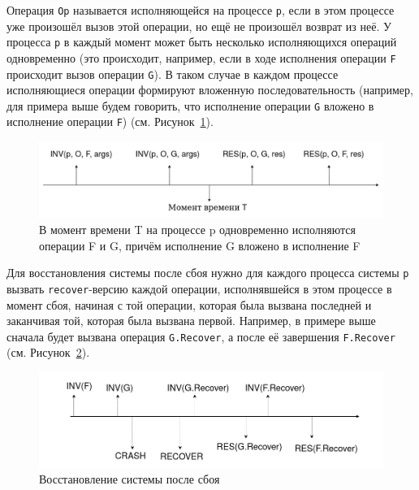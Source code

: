 \documentclass[times,specification,annotation]{itmo-student-thesis}
\begin{document}
\bigbreak

Операция \texttt{Op} называется исполняющейся на процессе \texttt{p}, если в этом процессе уже произошёл вызов этой операции, но ещё не произошёл возврат из неё. У процесса \texttt{p} в каждый момент может быть несколько исполняющихся операций одновременно (это происходит, например, если в ходе исполнения операции \texttt{F} происходит вызов операции \texttt{G}). В таком случае в каждом процессе исполняющиеся операции формируют вложенную последовательность (например, для примера выше будем говорить, что исполнение операции \texttt{G} вложено в исполнение операции \texttt{F}) (см. Рисунок~\ref{code-execution-pic}). 

\begin{figure}[H]
  \centering
  \caption{В момент  времени T на процессе p одновременно исполняются операции F и G, причём исполнение G вложено в исполнение F}
  \label{code-execution-pic}
  \includegraphics[width=\linewidth]{code_execution.png}
\end{figure}

Для восстановления системы после сбоя нужно для каждого процесса системы \texttt{p} вызвать \texttt{recover}-версию каждой операции, исполнявшейся в этом процессе в момент сбоя, начиная с той операции, которая была вызвана последней и заканчивая той, которая была вызвана первой. Например, в примере выше сначала будет вызвана операция \texttt{G.Recover}, а после её завершения \texttt{F.Recover} (см. Рисунок~\ref{code-execution-recovery-pic}).

\begin{figure}[H]
  \centering
  \caption{Восстановление системы после сбоя}
  \label{code-execution-recovery-pic}
  \includegraphics[width=\linewidth]{code_execution_recover.png}
\end{figure}
\end{document}
